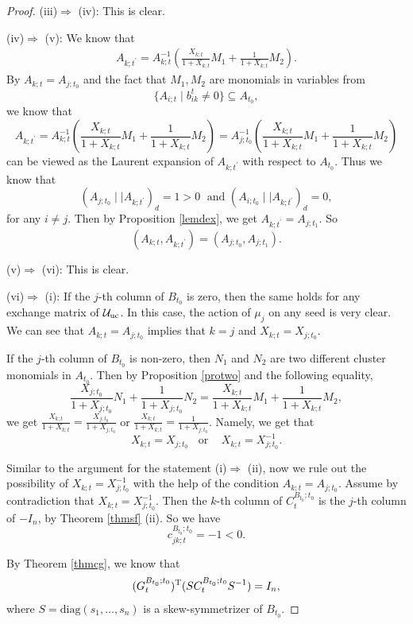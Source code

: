 \documentclass{amsart}
\theoremstyle{definition}
\theoremstyle{remark}
\numberwithin{equation}{section}
\begin{document}
\begin{proof}
(iii)$\Longrightarrow$ (iv): This is clear.


 (iv)$\Longrightarrow$ (v):
We know that
 \begin{eqnarray}
 A_{k;t^\prime}=A_{k;t}^{-1}(\frac{X_{k;t}}{1+X_{k;t}}M_1+\frac{1}{1+X_{k;t}}M_2).\nonumber
 \end{eqnarray}
By $A_{k;t}=A_{j;t_0}$ and the fact that $M_1, M_2$ are monomials in variables from $$\{A_{i;t}\mid b_{ik}^t\neq 0\}\subseteq A_{t_0},$$ we know that $$ A_{k;t^\prime}=A_{k;t}^{-1}(\frac{X_{k;t}}{1+X_{k;t}}M_1+\frac{1}{1+X_{k;t}}M_2)
=A_{j;t_0}^{-1}(\frac{X_{k;t}}{1+X_{k;t}}M_1+\frac{1}{1+X_{k;t}}M_2)$$
 can be viewed as the
 Laurent expansion of $A_{k;t^\prime}$ with respect to $A_{t_0}$.
Thus we know that $$(A_{j;t_0}\mid\mid  A_{k;t^\prime})_d=1>0\;\text{ and }(A_{i;t_0}\mid\mid  A_{k;t^\prime})_d=0,$$
for any $i\neq j$. Then by Proposition \ref{lemdex}, we get $A_{k;t^\prime}=A_{j;t_1}$. So $$(A_{k;t},A_{k;t^\prime})=(A_{j;t_0},A_{j;t_1}).$$

(v)$\Longrightarrow$ (vi): This is clear.

 (vi)$\Longrightarrow$ (i): If the $j$-th column  of $B_{t_0}$ is zero, then the same holds for any exchange matrix of $\mathcal U_{\rm uc}$. In this case,
 the action of $\mu_j$ on any seed is very clear. We can see that
 $A_{k;t}=A_{j;t_0}$ implies that $k=j$ and $X_{k;t}=X_{j;t_0}$.

 If the $j$-th column of $B_{t_0}$ is non-zero, then $N_1$ and $N_2$ are two different cluster monomials in $A_{t_0}$. Then by Proposition \ref{protwo} and the following equality,
  $$\frac{X_{j;t_0}}{1+X_{j;t_0}}N_1+\frac{1}{1+X_{j;t_0}}N_2=\frac{X_{k;t}}{1+X_{k;t}}M_1+\frac{1}{1+X_{k;t}}M_2,$$
  we  get $\frac{X_{k;t}}{1+X_{k;t}}=\frac{X_{j;t_0}}{1+X_{j;t_0}}$ or $\frac{X_{k;t}}{1+X_{k;t}}=\frac{1}{1+X_{j;t_0}}$. Namely, we get that $$X_{k;t}=X_{j;t_0}\;\;\text{ or }\;\;\;X_{k;t}=X_{j;t_0}^{-1}.$$

Similar to the argument for the statement (i)$\Longrightarrow$ (ii), now we rule out the possibility of $X_{k;t}=X_{j;t_0}^{-1}$ with the help of the condition $A_{k;t}=A_{j;t_0}$. Assume by contradiction that $X_{k;t}=X_{j;t_0}^{-1}$. Then the $k$-th column of $C_t^{B_{t_0};t_0}$ is the $j$-th column of $-I_n$, by Theorem \ref{thmsf} (ii). So we have $$c_{jk;t}^{B_{t_0};t_0}=-1<0.$$


 By Theorem \ref{thmcg}, we know that
 \begin{eqnarray}\label{eqncg}
 (G_t^{B_{t_0};t_0})^{\rm T}(SC_t^{B_{t_0};t_0}S^{-1})=I_n,
 \end{eqnarray}
 where  $S=\mathrm{diag}(s_1,\dots,s_n)$ is a skew-symmetrizer of $B_{t_0}$.



\end{proof}
\end{document}
